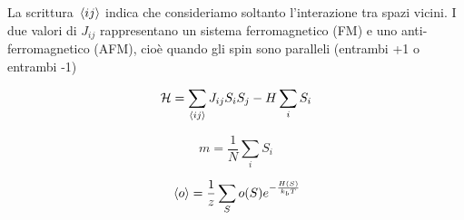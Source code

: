 La scrittura $\expval*{ij}$ indica che consideriamo soltanto l'interazione tra spazi vicini. I due valori di $J_{ij}$ rappresentano un sistema ferromagnetico (FM) e uno anti-ferromagnetico (AFM), cioè quando gli spin sono paralleli (entrambi +1 o entrambi -1)

$$\mathcal{H}=\sum_{\expval{ij}} J_{ij} S_i S_j - H \sum_{i} S_i$$

$$m=\frac{1}{N} \sum_{i} S_i$$

$$\expval*{o}=\frac{1}{z} \sum_{S} o(S) e^{-\frac{H(S)}{k_b T}}$$